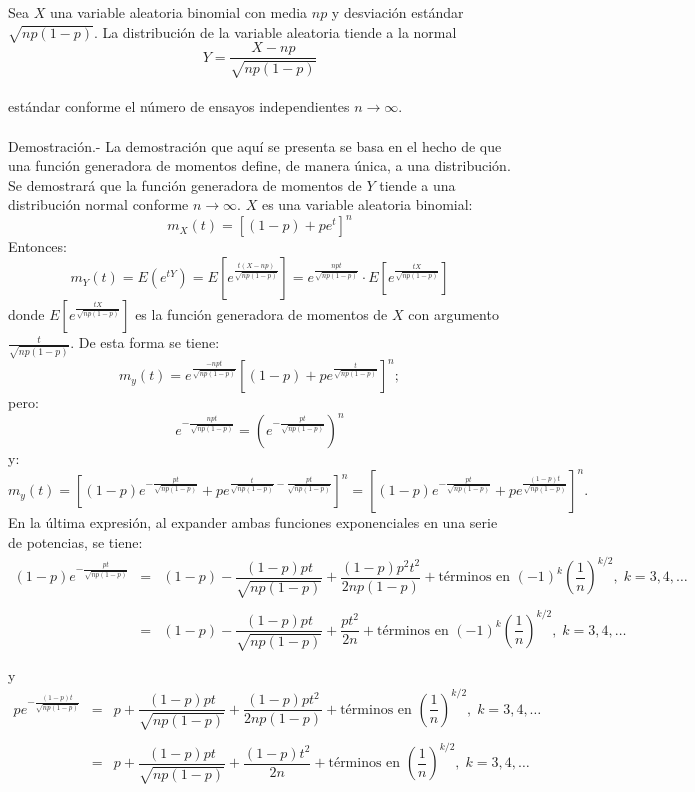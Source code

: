\begin{teo}
    Sea $X$ una variable aleatoria binomial con media $np$ y desviación estándar $\sqrt{np(1-p)}$. La distribución de la variable aleatoria tiende a la normal
    $$Y=\dfrac{X-np}{\sqrt{np(1-p)}}$$\\
    estándar conforme el número de ensayos independientes $n\to \infty$.\\\\
	Demostración.-\; La demostración que aquí se presenta se basa en el hecho de que una función generadora de momentos define, de manera única, a una distribución. Se demostrará que la función generadora de momentos de $Y$ tiende a una distribución normal conforme $n\to \infty$. $X$ es una variable aleatoria binomial:
	$$m_X(t)=[(1-p)+p e^t]^n$$
	Entonces:
	$$m_Y(t)=E(e^{tY})=E\left[e^{\frac{t(X-np)}{\sqrt{np(1-p)}}}\right] = e^{\frac{npt}{\sqrt{np(1-p)}}}\cdot E\left[e^{\frac{tX}{\sqrt{np(1-p)}}}\right]$$
	donde $E\left[e^{\frac{tX}{\sqrt{np(1-p)}}}\right]$ es la función generadora de momentos de $X$ con argumento $\frac{t}{\sqrt{np(1-p)}}$. De esta forma se tiene:
	$$m_y(t)=e^{\frac{-npt}{\sqrt{np(1-p)}}}\left[(1-p)+ pe^{\frac{t}{\sqrt{np(1-p)}}}\right]^n;$$
	pero:
	$$e^{-\frac{npt}{\sqrt{np(1-p)}}} = \left(e^{-\frac{pt}{\sqrt{np(1-p)}}}\right)^n$$
	y:
	$$m_y(t)=\left[(1-p)e^{-\frac{pt}{\sqrt{np(1-p)}}}+pe^{\frac{t}{\sqrt{np(1-p)}}-\frac{pt}{\sqrt{np(1-p)}}}\right]^n = \left[(1-p)e^{-\frac{pt}{\sqrt{np(1-p)}}}+pe^{\frac{(1-p)t}{\sqrt{np(1-p)}}}\right]^n.$$
	En la última expresión, al expander ambas funciones exponenciales en una serie de potencias, se tiene:
	$$\begin{array}{rcl}
	    (1-p)e^{-\frac{pt}{\sqrt{np(1-p)}}} &=& (1-p) - \dfrac{(1-p)pt}{\sqrt{np(1-p)}} + \dfrac{(1-p)p^2t^2}{2np(1-p)} + \mbox{términos en } (-1)^k \left(\dfrac{1}{n}\right)^{k/2}, \; k=3,4,\ldots\\\\
						&=&(1-p)-\dfrac{(1-p)pt}{\sqrt{np(1-p)}}+\dfrac{pt^2}{2n}+\mbox{términos en } (-1)^k\left(\dfrac{1}{n}\right)^{k/2},\; k=3,4,\ldots\\\\
	\end{array}$$
	y
	$$\begin{array}{rcl}
	    pe^{-\frac{(1-p)t}{\sqrt{np(1-p)}}} &=& p + \dfrac{(1-p)pt}{\sqrt{np(1-p)}} + \dfrac{(1-p)pt^2}{2np(1-p)} + \mbox{términos en } \left(\dfrac{1}{n}\right)^{k/2}, \; k=3,4,\ldots\\\\
						&=&p+\dfrac{(1-p)pt}{\sqrt{np(1-p)}}+\dfrac{(1-p)t^2}{2n}+\mbox{términos en } \left(\dfrac{1}{n}\right)^{k/2},\; k=3,4,\ldots\\\\
	\end{array}$$


\end{teo}

